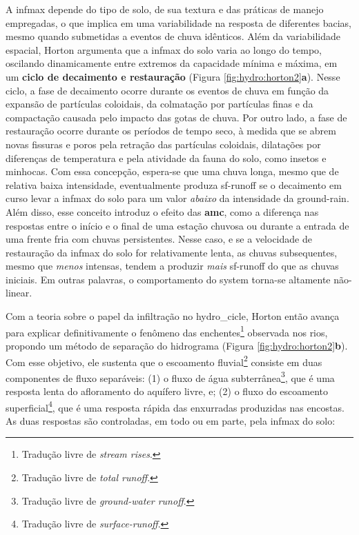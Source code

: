 \documentclass[./main.tex]{subfiles}
\begin{document}
\par A \gls{infmax} depende do tipo de solo, de sua textura e das práticas de manejo empregadas, o que implica em uma variabilidade na resposta de diferentes bacias, mesmo quando submetidas a eventos de chuva idênticos. Além da variabilidade espacial, Horton argumenta que a \gls{infmax} do solo varia ao longo do tempo, oscilando dinamicamente entre extremos da capacidade mínima e máxima, em um \textbf{ciclo de decaimento e restauração} (Figura \ref{fig:hydro:horton2}\textbf{a}). Nesse ciclo, a fase de decaimento ocorre durante os eventos de chuva em função da expansão de partículas coloidais, da colmatação por partículas finas e da compactação causada pelo impacto das gotas de chuva. Por outro lado, a fase de restauração ocorre durante os períodos de tempo seco, à medida que se abrem novas fissuras e poros pela retração das partículas coloidais, dilatações por diferenças de temperatura e pela atividade da fauna do solo, como insetos e minhocas. Com essa concepção, espera-se que uma chuva longa, mesmo que de relativa baixa intensidade, eventualmente produza \gls{sf-runoff} se o decaimento em curso levar a \gls{infmax} do solo para um valor \textit{abaixo} da intensidade da \gls{ground-rain}. Além disso, esse conceito introduz o efeito das \textbf{\gls{amc}}, como a diferença nas respostas entre o início e o final de uma estação chuvosa ou durante a entrada de uma frente fria com chuvas persistentes. Nesse caso, e se a velocidade de restauração da \gls{infmax} do solo for relativamente lenta, as chuvas subsequentes, mesmo que \textit{menos} intensas, tendem a produzir \textit{mais} \gls{sf-runoff} do que as chuvas iniciais. Em outras palavras, o comportamento do \gls{system} torna-se altamente não-linear.

\par Com a \gls{teoria} sobre o papel da infiltração no \gls{hydro_cicle}, Horton então avança para explicar definitivamente o fenômeno das enchentes\footnote{Tradução livre de \textit{stream rises}.} observada nos rios, propondo um método de separação do hidrograma (Figura \ref{fig:hydro:horton2}\textbf{b}). Com esse objetivo, ele sustenta que o escoamento fluvial\footnote{Tradução livre de \textit{total runoff}.} consiste em duas componentes de fluxo separáveis: (1) o fluxo de água subterrânea\footnote{Tradução livre de \textit{ground-water runoff}.}, que é uma resposta lenta do afloramento do aquífero livre, e; (2) o fluxo do escoamento superficial\footnote{Tradução livre de \textit{surface-runoff}.}, que é uma resposta rápida das enxurradas produzidas nas encostas. As duas respostas são controladas, em todo ou em parte, pela \gls{infmax} do solo:
\end{document}
